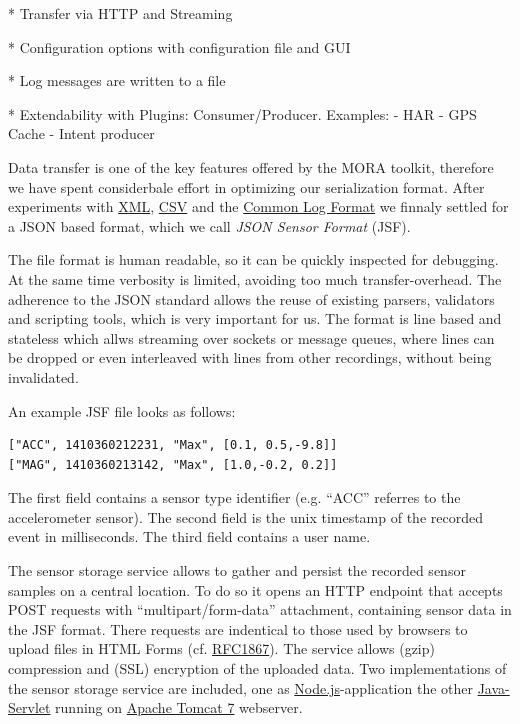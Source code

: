 \documentclass[times, 10pt,twocolumn]{article}
\begin{document}
* Transfer via HTTP and Streaming

* Configuration options with configuration file and GUI

* Log messages are written to a file

* Extendability with Plugins: Consumer/Producer. Examples:
  - HAR
  - GPS Cache
  - Intent producer

Data transfer is one of the key features offered by the MORA toolkit, therefore we have spent considerbale effort in optimizing our serialization format.
After experiments with \href{http://www.w3.org/XML/}{XML}, \href{http://tools.ietf.org/html/rfc4180}{CSV} and the \href{http://en.wikipedia.org/wiki/Common_Log_Format}{Common Log Format} we finnaly settled for a JSON based format, which we call {\em JSON Sensor Format} (JSF).

The file format is human readable, so it can be quickly inspected for debugging. At the same time verbosity is limited, avoiding too much transfer-overhead.
The adherence to the JSON standard allows the reuse of existing parsers, validators and scripting tools, which is very important for us.
The format is line based and stateless which allws streaming over sockets or message queues, where lines can be dropped or even interleaved with lines from other recordings, without being invalidated.

An example JSF file looks as follows:
\begingroup
\fontsize{9pt}{10pt}\selectfont
\begin{verbatim}
["ACC", 1410360212231, "Max", [0.1, 0.5,-9.8]]
["MAG", 1410360213142, "Max", [1.0,-0.2, 0.2]]
\end{verbatim}
\endgroup
The first field contains a sensor type identifier (e.g. ``ACC'' referres to the accelerometer sensor). 
The second field is the unix timestamp of the recorded event in milliseconds.
The third field contains a user name.



The sensor storage service allows to gather and persist the recorded sensor samples on a central location.
To do so it opens an HTTP endpoint that accepts POST requests with ``multipart/form-data'' attachment, containing sensor data in the JSF format.
There requests are indentical to those used by browsers to upload files in HTML Forms (cf. \href{https://www.ietf.org/rfc/rfc1867.txt}{RFC1867}).
The service allows (gzip) compression and (SSL) encryption of the uploaded data.
Two implementations of the sensor storage service are included, one as \href{http://nodejs.org}{Node.js}-application the other \href{https://www.jcp.org/en/jsr/detail?id=154}{Java-Servlet} running on \href{http://tomcat.apache.org/}{Apache Tomcat 7} webserver.
\end{document}
